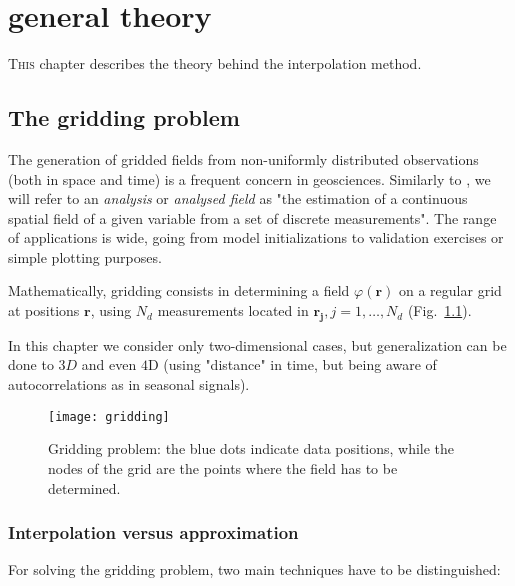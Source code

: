 \chapter{\diva\divaspace general theory\label{chaptheory}}


\lettrine[lines=2, loversize=-0.1, lraise=0.1]{T}{his} chapter describes the theory behind the \diva interpolation method. 

\minitoc


\section{The gridding problem\label{gridding}}

The generation of gridded fields from non-uniformly distributed observations (both in space and time) is a frequent concern in geosciences. Similarly to \citet{OOYAMA87}, we will refer to an \textit{analysis} or \textit{analysed field} as "the estimation of a continuous spatial field of a given variable from a set of discrete measurements". The range of applications is wide, going from model initializations to validation exercises  or simple plotting purposes. 

Mathematically, gridding consists in determining a field $\varphi(\mathbf{r})$ on a regular grid at positions $\mathbf{r}$, using $N_{d}$ measurements located in $\mathbf{r_{j}}, j=1,\ldots, N_{d}$ (Fig.~\ref{gridproblem}).  

In this chapter we consider only two-dimensional cases, but generalization can be done to $3D$ and even $4$D (using "distance" in time, but being aware of autocorrelations as in seasonal signals).

\begin{figure}[htpb]
	\centering
	\parbox{.5\textwidth}{
		\texttt{[image: gridding]}
		}\parbox{.5\textwidth}{
		\caption{Gridding problem: the blue dots indicate data positions, while the nodes of the grid  are the points where the field has to be determined.\label{gridproblem}}
		}
\end{figure}

\subsection{Interpolation versus approximation}

For solving the gridding problem, two main techniques have to be distinguished:

